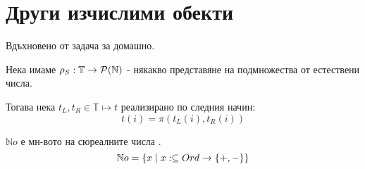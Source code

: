 \section{Други изчислими обекти}
Вдъхновено от задача за домашно.

Нека имаме $\rho_S : \mathbb T \to \mathcal P({\mathbb{N}})$ - някакво представяне на подмножества от естествени числа.

Тогава нека $t_L, t_R \in \mathbb T \mapsto t$ реализирано по следния начин:
\begin{equation}
    t(i) = \pi (t_L(i), t_R(i))
\end{equation}

\begin{definition}
    $\mathbb No$ е мн-вото на сюреалните числа \cite{knuth1974surreal}.
    \begin{equation}
        {\mathbb{N}} o = \left\{x \mid x: \subseteq Ord \to \left\{+, -\right\}\right\}
    \end{equation}
\end{definition}
